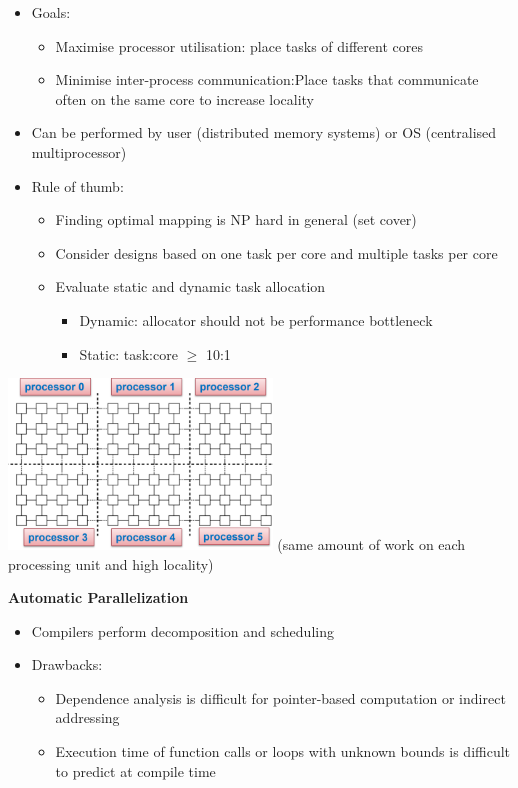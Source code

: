 \documentclass[10pt, landscape]{article}
\begin{document}
\begin{multicols}{4}
\begin{enumerate}
\begin{itemize}
        \item Goals:
        \begin{itemize}
            \item Maximise processor utilisation: place tasks of different cores
            \item Minimise inter-process communication:Place tasks that communicate often on the same core to increase locality 
        \end{itemize}
        \item Can be performed by user (distributed memory systems) or OS (centralised multiprocessor) 
        \item Rule of thumb:
        \begin{itemize}
            \item Finding optimal mapping is NP hard in general (set cover) 
            \item Consider designs based on one task per core and multiple tasks per core 
            \item Evaluate static and dynamic task allocation 
            \begin{itemize}
                \item Dynamic: allocator should not be performance bottleneck 
                \item Static: task:core $\ge$ 10:1
            \end{itemize}
        \end{itemize}
    \end{itemize}
    \includegraphics*[width=7cm]{mapping} 
    (same amount of work on each processing unit and high locality)
\end{enumerate}

\textbf{Automatic Parallelization}
\begin{itemize}
    \item Compilers perform decomposition and scheduling 
    \item Drawbacks:
    \begin{itemize}
        \item Dependence analysis is difficult for pointer-based computation or indirect addressing 
        \item Execution time of function calls or loops with unknown bounds is difficult to predict at compile time
    \end{itemize}
\end{itemize}


\end{multicols}
\end{document}
